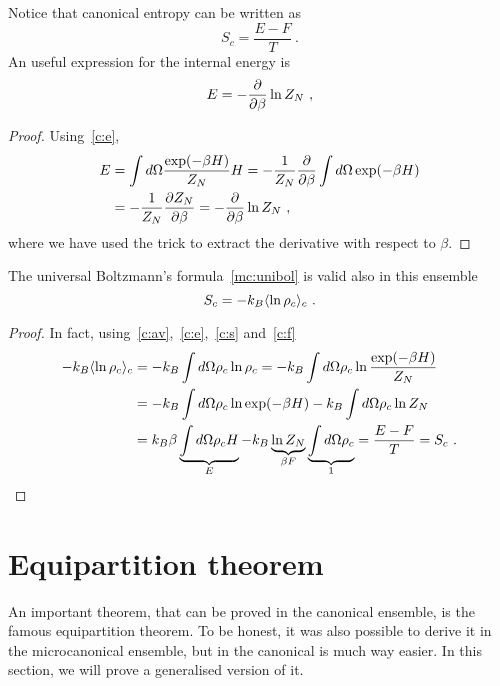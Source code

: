     Notice that canonical entropy can be written as 
    \begin{equation} \label{c:s}
        S_c = \frac{E - F}{T} ~.
    \end{equation}
    An useful expression for the internal energy is
    \begin{equation}\label{c:e2}
        E = - \frac{\partial}{\partial\beta} \ln Z_N ~,
    \end{equation}
    \begin{proof}
        Using~\eqref{c:e},
        \begin{equation*}
        \begin{aligned}
            E & = \int d\Omega \frac{\exp(-\beta H)}{Z_N} H = - \frac{1}{Z_N} \frac{\partial}{\partial\beta} \int d\Omega \exp (-\beta H) \\ & = - \frac{1}{Z_N} \frac{\partial Z_N}{\partial\beta} = - \frac{\partial}{\partial\beta} \ln Z_N ~,
        \end{aligned}
        \end{equation*}
        where we have used the trick to extract the derivative with respect to $\beta$.
    \end{proof}
    The universal Boltzmann's formula~\eqref{mc:unibol} is valid also in this ensemble
    \begin{equation*}
        S_c = -k_B \langle\ln \rho_c\rangle_{c}  ~.
    \end{equation*}
    \begin{proof}
        In fact, using~\eqref{c:av},~\eqref{c:e},~\eqref{c:s} and~\eqref{c:f}
        \begin{equation*}
        \begin{aligned}
            -k_B \langle\ln \rho_c\rangle_{c} & = -k_B \int d\Omega \rho_c \ln \rho_c  = -k_B \int d\Omega \rho_c \ln \frac{\exp(-\beta H)}{Z_N} \\ & = -k_B \int d\Omega \rho_c \ln \exp(-\beta H) - k_B \int d\Omega \rho_c \ln Z_N \\ & = k_B  \beta \underbrace{\int d\Omega \rho_c H }_E - k_B \underbrace{\ln Z_N}_{\beta F} \underbrace{\int d\Omega \rho_c}_{1} = \frac{E - F}{T} = S_c ~.
        \end{aligned}
        \end{equation*}
    \end{proof}

\section{Equipartition theorem}

    An important theorem, that can be proved in the canonical ensemble, is the famous equipartition theorem. To be honest, it was also possible to derive it in the microcanonical ensemble, but in the canonical is much way easier. In this section, we will prove a generalised version of it.

